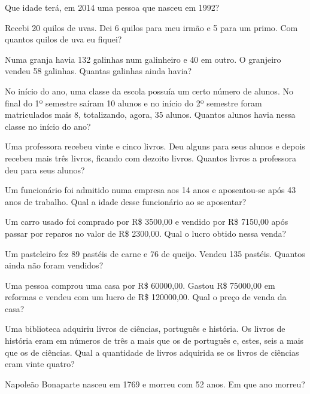 	\item Que idade terá, em 2014 uma pessoa que nasceu em 1992?

	\item Recebi 20 quilos de uvas. Dei 6 quilos para meu irmão e 5 para um primo. Com quantos quilos de uva eu fiquei?

	\item Numa granja havia 132 galinhas num galinheiro e 40 em outro. O granjeiro vendeu 58 galinhas. Quantas galinhas ainda havia?

	\item No início do ano, uma classe da escola possuía um certo número de alunos. No final do 1º semestre saíram 10 alunos e no início do 2º semestre foram matriculados mais 8, totalizando, agora, 35 alunos. Quantos alunos havia nessa classe no início do ano?

	\item Uma professora recebeu vinte e cinco livros. Deu alguns para seus alunos e depois recebeu mais três livros, ficando com dezoito livros. Quantos livros a professora deu para seus alunos?	
	
	\item Um funcionário foi admitido numa empresa aos 14 anos e aposentou-se após 43 anos de trabalho. Qual a idade desse funcionário ao se aposentar?

	\item Um carro usado foi comprado por R\$ 3500,00 e vendido por R\$ 7150,00 após passar por reparos no valor de R\$ 2300,00. Qual o lucro obtido nessa venda?
	\item Um pasteleiro fez 89 pastéis de carne e 76 de queijo. Vendeu 135 pastéis. Quantos ainda não foram vendidos?

	\item Uma pessoa comprou uma casa por R\$ 60000,00. Gastou R\$ 75000,00 em reformas e vendeu com um lucro de R\$ 120000,00. Qual o preço de venda da casa?

	\item Uma biblioteca adquiriu livros de ciências, português e história. Os livros de história eram em números de três a mais que os de português e, estes, seis a mais que os de ciências. Qual a quantidade de livros adquirida se os livros de ciências eram vinte quatro?

	\item Napoleão Bonaparte nasceu em 1769 e morreu com 52 anos. Em que ano morreu?



